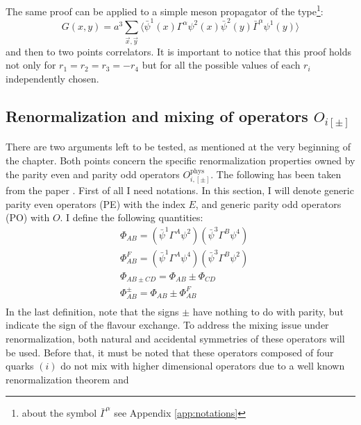 \documentclass[english, LaM, oneside, noexaminfo]{sapthesis}
\newcommand{\la}{\langle}
\newcommand{\ra}{\rangle}
\begin{document}
The same proof can be applied to a simple meson propagator of the type\footnote{about the symbol $\bar\Gamma^\alpha$ see Appendix \ref{app:notations}}:
\begin{equation*}
    G(x,y)=a^3\sum_{\vec x, \vec y} \Big\la \bar \psi^1 (x) \Gamma^\alpha \psi^2 (x) \bar\psi^2 (y) \bar\Gamma^\alpha \psi^1 (y) \Big\ra 
\end{equation*}
and then to two points correlators.
It is important to notice that this proof holds not only for $r_1=r_2=r_3=-r_4$ but for all the possible values of each $r_i$ independently chosen.


\subsection{Renormalization and mixing of operators $O_{i[\pm]}$}\label{sec:renormalization-properties}
\noindent
There are two arguments left to be tested, as mentioned at the very beginning of the chapter.
Both points concern the specific renormalization properties owned by the parity even and parity odd operators $O_{i,[\pm]}^\text{phys}$.
The following has been taken from the paper \cite{DoniniMartinelliOperators}.
\newline
First of all I need notations.
In this section, I will denote generic parity even operators (PE) with the index ${E}$, and generic parity odd operators (PO) with ${O}$.
I define the following quantities:
\begin{equation*}
    \begin{split}
        & \Phi_{AB} = \left( \bar \psi^1 \Gamma^A \psi^2 \right) \left( \bar \psi^3 \Gamma^B \psi^4 \right) \\
        & \Phi_{AB}^F = \left( \bar \psi^1 \Gamma^A \psi^4 \right) \left( \bar \psi^3 \Gamma^B \psi^2 \right) \\
        & \Phi_{AB \pm CD} = \Phi_{AB} \pm \Phi_{CD} \\
        & \Phi_{AB}^\pm = \Phi_{AB} \pm \Phi_{AB}^F \\
    \end{split}
\end{equation*}
In the last definition, note that the signs $\pm$ have nothing to do with parity, but indicate the sign of the flavour exchange.
\newline
To address the mixing issue under renormalization, both natural and accidental symmetries of these operators will be used.
Before that, it must be noted that these operators composed of four quarks
$(i)$ do not mix with higher dimensional operators due to a well known renormalization theorem \cite{Collins} and
\end{document}
